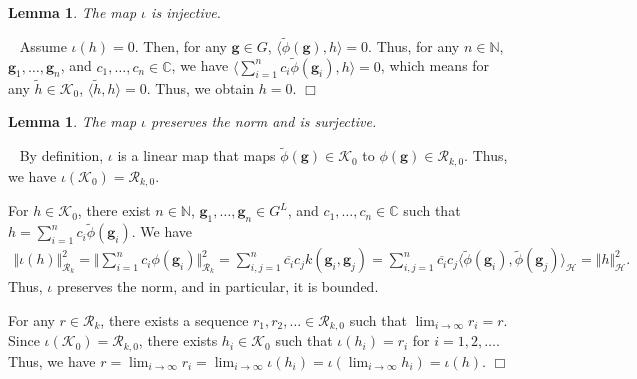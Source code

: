 \documentclass[twoside]{article}
\newtheorem{lemma}[proposition]{Lemma}
\newenvironment{proof}[1][Proof\ ]{\medskip\noindent{\bf #1}\ }{%
\hfill $\Box$\par\quad\par}
\def\mcl#1{\mathcal{#1}}
\def\hil{\mcl{H}}
\def\sbracket#1{\langle #1\rangle}
\def\bg{\mathbf{g}}
\begin{document}
\begin{lemma}\label{lem:iota_injective}
The map $\iota$ is injective.
\end{lemma}
\begin{proof}
Assume $\iota(h)=0$.
Then, for any $\mathbf{g}\in G$, $\sbracket{\tilde{\phi}(\bg),h}=0$.
Thus, for any $n\in\mathbb{N}$, $\bg_1,\ldots,\bg_n$, and  $c_1,\ldots,c_n\in\mathbb{C}$, we have $\sbracket{\sum_{i=1}^nc_i\tilde{\phi}(\bg_i),h}=0$, which means for any $\tilde{h}\in\mcl{K}_0$, $\sbracket{\tilde{h},h}=0$.
Thus, we obtain $h=0$.
\end{proof}

\begin{lemma}\label{lem:iota_surjective}
The map $\iota$ preserves the norm and is surjective.
\end{lemma}
\begin{proof}
By definition, $\iota$ is a linear map that maps $\tilde{\phi}(\bg)\in\mcl{K}_0$ to $\phi(\bg)\in\mcl{R}_{k,0}$.
Thus, we have $\iota(\mcl{K}_0)=\mcl{R}_{k,0}$.

For $h\in\mcl{K}_0$, there exist $n\in\mathbb{N}$, $\bg_1,\ldots,\bg_n\in G^L$, and $c_1,\ldots,c_n\in\mathbb{C}$ such that $h=\sum_{i=1}^nc_i\tilde{\phi}(\bg_i)$.
We have
\begin{align*}
\Vert\iota(h)\Vert^2_{\mcl{R}_k} = \bigg\Vert\sum_{i=1}^n c_i \phi(\bg_i)\bigg\Vert^2_{\mathcal{R}_k} = \sum_{i,j=1}^n\overline{c_i}c_jk(\bg_i,\bg_j)
=\sum_{i,j=1}^n\overline{c_i}c_j\sbracket{\tilde{\phi}(\bg_i),\tilde{\phi}(\bg_j)}_{\hil}
=\Vert h\Vert^2_{\hil}.
\end{align*}
Thus, $\iota$ preserves the norm, and in particular, it is bounded.

For any $r\in \mcl{R}_k$, there exists a sequence $r_1,r_2,\ldots \in \mcl{R}_{k,0}$ such that $\lim_{i\to\infty}r_i=r$.
Since $\iota(\mcl{K}_0)=\mcl{R}_{k,0}$, there exists $h_i\in\mcl{K}_0$ such that $\iota(h_i)=r_i$ for $i=1,2,\ldots$.
Thus, we have $r=\lim_{i\to\infty}r_i=\lim_{i\to\infty}\iota(h_i)=\iota(\lim_{i\to\infty}h_i)=\iota(h)$.
\end{proof}
\end{document}
